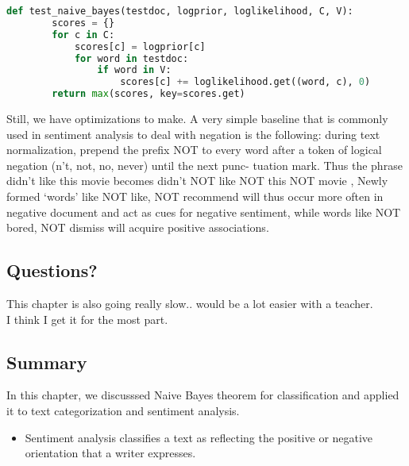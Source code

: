 \documentclass{article}
\begin{document}
\begin{lstlisting}[language=Python]
    def test_naive_bayes(testdoc, logprior, loglikelihood, C, V):
        scores = {}
        for c in C:
            scores[c] = logprior[c]
            for word in testdoc:
                if word in V:
                    scores[c] += loglikelihood.get((word, c), 0)
        return max(scores, key=scores.get)
    \end{lstlisting}



Still, we have optimizations to make. A very simple baseline that is commonly used in sentiment analysis to deal with
negation is the following: during text normalization, prepend the prefix NOT to
every word after a token of logical negation (n’t, not, no, never) until the next punc-
tuation mark. Thus the phrase
didn’t like this movie  becomes didn’t NOT like NOT this NOT movie ,
Newly formed ‘words’ like NOT like, NOT recommend will thus occur more
often in negative document and act as cues for negative sentiment, while words
like NOT bored, NOT dismiss will acquire positive associations.


\subsection{Questions?}
This chapter is also going really slow.. would be a lot easier with a teacher.
\\ I think I get it for the most part.

\subsection{Summary}
In this chapter, we discusssed Naive Bayes theorem for classification and applied it to text categorization and sentiment analysis.
\begin{itemize}
    \item Sentiment analysis classifies a text as reflecting the positive or negative orientation that a writer expresses.
\end{itemize}
\end{document}
